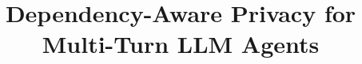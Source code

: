 \documentclass[sigconf,review,anonymous]{acmart}
\theoremstyle{definition}
\begin{document}
%
\title{Dependency-Aware Privacy for Multi-Turn LLM Agents}




% 
\end{document}
